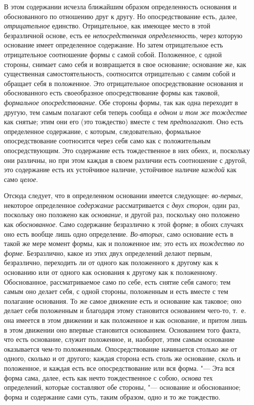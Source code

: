 В этом содержании исчезла ближайшим образом определенность основания и
обоснованного по отношению друг к другу. Но опосредствование есть, далее,
{\em отрицательное} единство. Отрицательное, как
имеющее место в этой безразличной основе, есть ее
{\em непосредственная определенность}, через которую
основание имеет определенное содержание. Но затем отрицательное есть
отрицательное соотношение формы с самой собой. Положенное, с одной стороны,
снимает само себя и возвращается в свое основание; основание же, как
существенная самостоятельность, соотносится отрицательно с самим собой и
обращает себя в положенное. Это отрицательное опосредствование основания и
обоснованного есть своеобразное опосредствование формы как таковой,
{\em формальное опосредствование}. Обе стороны формы,
так как одна переходит в другую, тем самым полагают себя теперь сообща
{\em в одном и том же тождестве} как снятые; этим они
его (это тождество) вместе с тем {\em предполагают}.
Оно есть определенное содержание, с которым, следовательно, формальное
опосредствование соотносится через себя само как с положительным
опосредствующим. Это содержание есть тождественное в них обеих, и,
поскольку они различны, но при этом каждая в своем различии есть
соотношение с другой, это содержание есть их устойчивое наличие, устойчивое
наличие {\em каждой} как само
{\em целое}.

Отсюда следует, что в определенном основании имеется следующее:
{\em во-первых}, некоторое определенное
{\em содержание} рассматривается с
{\em двух сторон}, один раз, поскольку оно положено как
{\em основание}, и другой раз, поскольку оно положено
как {\em обоснованное}. Само содержание безразлично к
этой форме; в обоих случаях оно есть вообще лишь одно определение.
{\em Во-вторых}, само основание есть в такой же мере
момент формы, как и положенное им; это есть их
{\em тождество по форме}. Безразлично, какое из этих
двух определений делают первым, безразлично, переходить ли от одного как
положенного к другому как к основанию или от одного как основания к другому
как к положенному. Обоснованное, рассматриваемое само по себе, есть снятие
себя самого; тем самым оно делает себя, с одной стороны, положенным и есть
вместе с тем полагание основания. То же самое движение есть и основание как
таковое; оно делает себя положенным и благодаря этому становится основанием
чего-то, т.~е. она имеется в этом движении и как положенное и как
основание, и притом лишь в этом движении оно впервые становится основанием.
Основанием того факта, что есть основание, служит положенное, и, наоборот,
этим самым основание оказывается чем-то положенным. Опосредствование
начинается столько же от одного, сколько и от другого; каждая сторона есть
столь же основание, сколь и положенное, и каждая есть все опосредствование
или вся форма. "--- Эта вся форма сама, далее, есть как нечто тождественное с
собою, {\em основа} тех определений, которые составляют
обе стороны, "--- основание и обоснованное; форма и содержание сами суть,
таким образом, одно и то же тождество.

